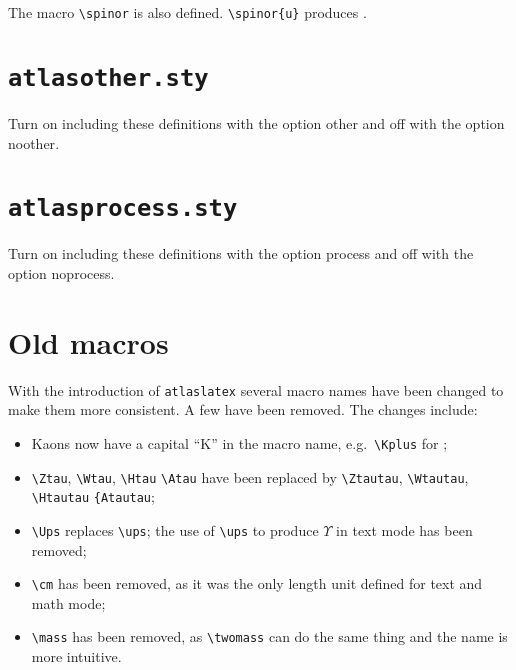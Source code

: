 \documentclass[koma,UKenglish]{latex/atlasdoc}
\newcommand{\File}[1]{\texttt{#1}\xspace}
\newcommand{\Macro}[1]{\texttt{\textbackslash #1}\xspace}
\newcommand{\Option}[1]{\textsf{#1}\xspace}
\newcommand{\Package}[1]{\texttt{#1}\xspace}
\begin{document}
{

\noindent The macro \Macro{spinor} is also defined.
\verb|\spinor{u}| produces .


\newpage
\section{\File{atlasother.sty}}

Turn on including these definitions with the option \Option{other} and off with the option \Option{noother}.




\newpage
\section{\File{atlasprocess.sty}}

Turn on including these definitions with the option \Option{process} and off with the option \Option{noprocess}.




\onecolumn
\section{Old macros}
\label{sec:old}

With the introduction of \Package{atlaslatex} several macro names have been changed to make them more consistent.
A few have been removed. The changes include:
\begin{itemize}
\item Kaons now have a capital ``K'' in the macro name, e.g.\ \verb|\Kplus| for \Kplus;
\item \verb|\Ztau|, \verb|\Wtau|, \verb|\Htau| \verb|\Atau| have been replaced by
	\verb|\Ztautau|, \verb|\Wtautau|, \verb|\Htautau| \verb|{Atautau|;
\item \verb|\Ups| replaces \verb|\ups|;
	the use of \verb|\ups| to produce $\Upsilon$ in text mode has been removed;
\item \verb|\cm| has been removed, as it was the only length unit defined for text and math mode;
\item \verb|\mass| has been removed, as \verb|\twomass| can do the same thing and the name is more intuitive.
\end{itemize}

}
\end{document}
